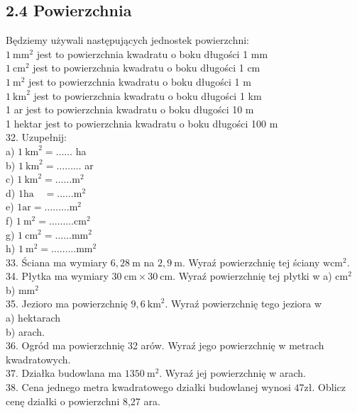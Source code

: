\documentclass[10pt]{article}
\begin{document}
\subsection*{2.4 Powierzchnia}
Będziemy używali następujących jednostek powierzchni:\\
\(1 \mathrm{~mm}^{2}\) jest to powierzchnia kwadratu o boku długości 1 mm\\
\(1 \mathrm{~cm}^{2}\) jest to powierzchnia kwadratu o boku długości 1 cm\\
\(1 \mathrm{~m}^{2}\) jest to powierzchnia kwadratu o boku długości 1 m\\
\(1 \mathrm{~km}^{2}\) jest to powierzchnia kwadratu o boku długości 1 km\\
1 ar jest to powierzchnia kwadratu o boku długości 10 m\\
1 hektar jest to powierzchnia kwadratu o boku długości 100 m\\
32. Uzupełnij:\\
a) \(1 \mathrm{~km}^{2}=\ldots \ldots\) ha\\
b) \(1 \mathrm{~km}^{2}=\ldots \ldots \ldots\) ar\\
c) \(1 \mathrm{~km}^{2}=\ldots \ldots \mathrm{m}^{2}\)\\
d) \(1 \mathrm{ha} \quad=\ldots \ldots \mathrm{m}^{2}\)\\
e) \(1 \mathrm{ar}=\ldots \ldots \ldots \mathrm{m}^{2}\)\\
f) \(1 \mathrm{~m}^{2}=\ldots \ldots \ldots \mathrm{cm}^{2}\)\\
g) \(1 \mathrm{~cm}^{2}=\ldots \ldots \mathrm{mm}^{2}\)\\
h) \(1 \mathrm{~m}^{2}=\ldots \ldots \ldots \mathrm{mm}^{2}\)\\
33. Ściana ma wymiary \(6,28 \mathrm{~m}\) na \(2,9 \mathrm{~m}\). Wyraź powierzchnię tej ściany \(\mathrm{w} \mathrm{cm}^{2}\).\\
34. Płytka ma wymiary \(30 \mathrm{~cm} \times 30 \mathrm{~cm}\). Wyraź powierzchnię tej płytki w a) \(\mathrm{cm}^{2}\) b) \(\mathrm{mm}^{2}\)\\
35. Jezioro ma powierzchnię \(9,6 \mathrm{~km}^{2}\). Wyraź powierzchnię tego jeziora w\\
a) hektarach\\
b) arach.\\
36. Ogród ma powierzchnię 32 arów. Wyraź jego powierzchnię w metrach kwadratowych.\\
37. Działka budowlana ma \(1350 \mathrm{~m}^{2}\). Wyraź jej powierzchnię w arach.\\
38. Cena jednego metra kwadratowego działki budowlanej wynosi \(47 \mathrm{zł}\). Oblicz cenę działki o powierzchni 8,27 ara.
\end{document}
